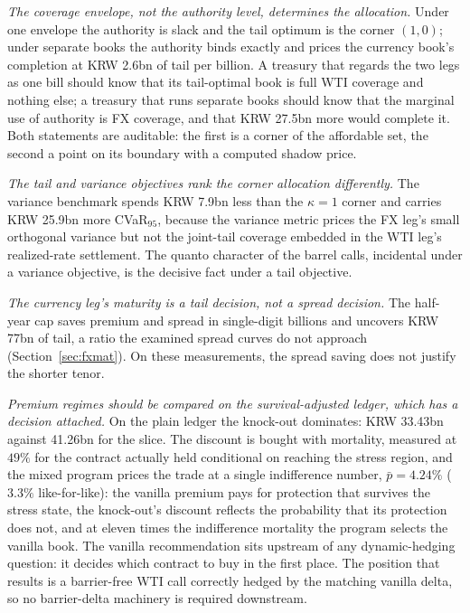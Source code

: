 \documentclass[11pt,a4paper]{article}
\begin{document}
\emph{The coverage envelope, not the authority level, determines the allocation.} Under one envelope the authority is slack and the tail optimum is the corner $(1,0)$; under separate books the authority binds exactly and prices the currency book's completion at KRW 2.6bn of tail per billion. A treasury that regards the two legs as one bill should know that its tail-optimal book is full WTI coverage and nothing else; a treasury that runs separate books should know that the marginal use of authority is FX coverage, and that KRW 27.5bn more would complete it. Both statements are auditable: the first is a corner of the affordable set, the second a point on its boundary with a computed shadow price.

\emph{The tail and variance objectives rank the corner allocation differently.} The variance benchmark spends KRW 7.9bn less than the $\kappa=1$ corner and carries KRW 25.9bn more CVaR$_{95}$, because the variance metric prices the FX leg's small orthogonal variance but not the joint-tail coverage embedded in the WTI leg's realized-rate settlement. The quanto character of the barrel calls, incidental under a variance objective, is the decisive fact under a tail objective.

\emph{The currency leg's maturity is a tail decision, not a spread decision.} The half-year cap saves premium and spread in single-digit billions and uncovers KRW 77bn of tail, a ratio the examined spread curves do not approach (Section~\ref{sec:fxmat}). On these measurements, the spread saving does not justify the shorter tenor.

\emph{Premium regimes should be compared on the survival-adjusted ledger, which has a decision attached.} On the plain ledger the knock-out dominates: KRW 33.43bn against 41.26bn for the slice. The discount is bought with mortality, measured at $49\%$ for the contract actually held conditional on reaching the stress region, and the mixed program prices the trade at a single indifference number, $\bar p=4.24\%$ ($3.3\%$ like-for-like): the vanilla premium pays for protection that survives the stress state, the knock-out's discount reflects the probability that its protection does not, and at eleven times the indifference mortality the program selects the vanilla book. The vanilla recommendation sits upstream of any dynamic-hedging question: it decides which contract to buy in the first place. The position that results is a barrier-free WTI call correctly hedged by the matching vanilla delta, so no barrier-delta machinery is required downstream.
\end{document}
